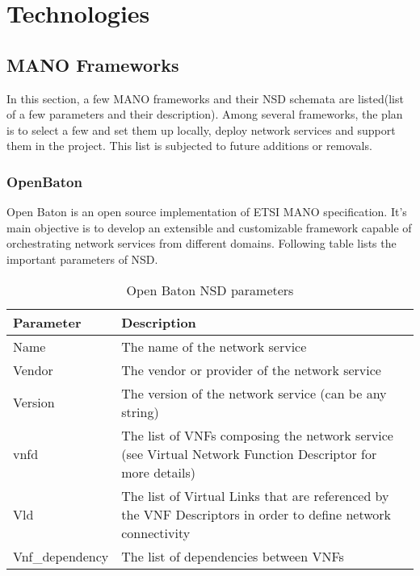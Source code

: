 \chapter{Technologies}
\label{ch:Technologies}
\section{MANO Frameworks}
In this section, a few MANO frameworks and their NSD schemata are listed(list of a few parameters and their description). Among several frameworks, the plan is to select a few and set them up locally, deploy network services and support them in the project. This list is subjected to future additions or removals.
\subsection{OpenBaton}
Open Baton is an open source implementation of ETSI MANO specification. It's main objective is to develop an extensible and customizable framework capable of orchestrating network services from different domains\cite{openBaton}. Following table lists the important parameters of NSD\cite{openBatonSchemaDocumentation}. 
    \begin{table}[h]
        \centering
        \begin{tabular}{ |p{4cm}|p{10cm}|}
            \hline
            \textbf{Parameter} & \textbf{Description} \\
            \hline
             
             Name & The name of the network service \\
             \hline
             Vendor & The vendor or provider of the network service \\
             \hline
             Version & The version of the network service (can be any string) \\
             \hline
             vnfd & The list of VNFs composing the network service (see Virtual Network Function Descriptor for more details) \\
             \hline
             Vld & The list of Virtual Links that are referenced by the VNF Descriptors in order to define network connectivity \\
             \hline
             Vnf\_dependency & The list of dependencies between VNFs\\
             \hline
        \end{tabular}
        \caption{Open Baton NSD parameters}
        \label{tab:OpenBatonSchema}
    \end{table}
